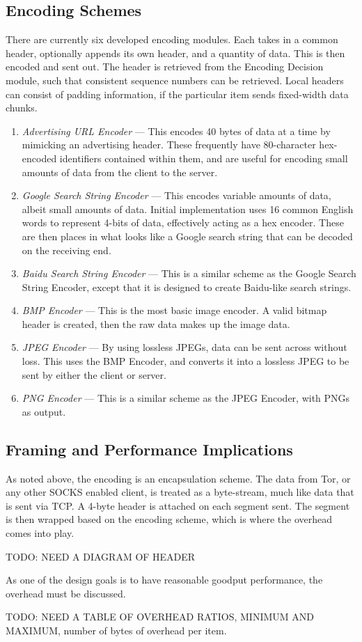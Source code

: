 \subsection{Encoding Schemes}
There are currently six developed encoding modules. Each takes in a common header, optionally appends its own header, and a quantity of data. This is then encoded and sent out. The header is retrieved from the Encoding Decision module, such that consistent sequence numbers can be retrieved. Local headers can consist of padding information, if the particular item sends fixed-width data chunks. 

\begin{enumerate}
  \item \emph{Advertising URL Encoder} --- This encodes 40 bytes of data at a time by mimicking an advertising header. These frequently have 80-character hex-encoded identifiers contained within them, and are useful for encoding small amounts of data from the client to the server.
  \item \emph{Google Search String Encoder} --- This encodes variable amounts of data, albeit small amounts of data. Initial implementation uses 16 common English words to represent 4-bits of data, effectively acting as a hex encoder. These are then places in what looks like a Google search string that can be decoded on the receiving end.
  \item \emph{Baidu Search String Encoder} --- This is a similar scheme as the Google Search String Encoder, except that it is designed to create Baidu-like search strings.
  \item \emph{BMP Encoder} --- This is the most basic image encoder. A valid bitmap header is created, then the raw data makes up the image data.
  \item \emph{JPEG Encoder} --- By using lossless JPEGs, data can be sent across without loss. This uses the BMP Encoder, and converts it into a lossless JPEG to be sent by either the client or server.
  \item \emph{PNG Encoder} --- This is a similar scheme as the JPEG Encoder, with PNGs as output.
\end{enumerate}

\subsection{Framing and Performance Implications}
As noted above, the encoding is an encapsulation scheme. The data from Tor, or any other SOCKS enabled client, is treated as a byte-stream, much like data that is sent via TCP. A 4-byte header is attached on each segment sent. The segment is then wrapped based on the encoding scheme, which is where the overhead comes into play.


TODO: NEED A DIAGRAM OF HEADER


As one of the design goals is to have reasonable goodput performance, the overhead must be discussed. 


TODO: NEED A TABLE OF OVERHEAD RATIOS, MINIMUM AND MAXIMUM, number of bytes of overhead per item.
